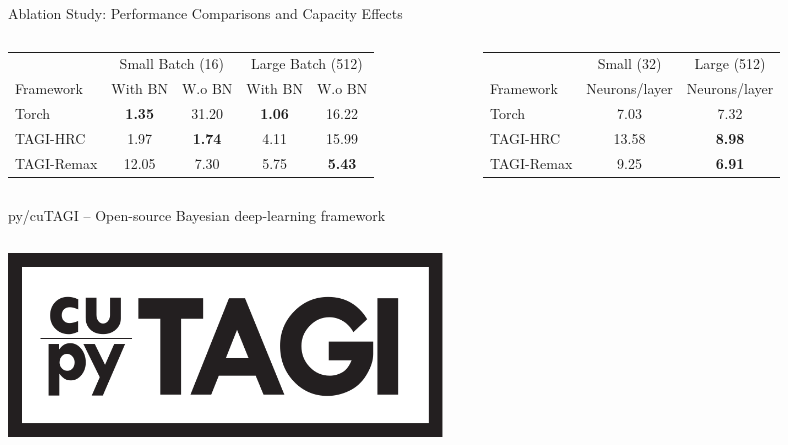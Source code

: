 \documentclass[final]{beamer}
\begin{document}
\begin{frame}[t]
\begin{columns}
\begin{column}[T]{.31\textwidth}
\begin{block}{Ablation Study: Performance Comparisons and Capacity Effects}
\begin{columns}
\begin{column}{0.48\textwidth}
\centering
\begin{tabular}{lcccc}
\toprule
 & \multicolumn{2}{c}{Small Batch (16)} & \multicolumn{2}{c}{Large Batch (512)} \\
Framework & With BN & W.o BN & With BN & W.o BN \\
\midrule
Torch      & \textbf{1.35} & 31.20 & \textbf{1.06} & 16.22 \\
TAGI-HRC       & 1.97         & \textbf{1.74} & 4.11 & 15.99 \\
TAGI-Remax & 12.05         & 7.30         & 5.75 & \textbf{5.43} \\
\bottomrule
\end{tabular}
\end{column}
\begin{column}{0.48\textwidth}
\centering
\begin{tabular}{lcc}
\toprule
 & Small (32) & Large (512) \\
Framework & Neurons/layer & Neurons/layer \\
\midrule
Torch      & 7.03 &  7.32 \\
TAGI-HRC       & 13.58         &  \textbf{8.98} \\
TAGI-Remax &  9.25         &  \textbf{6.91} \\
\bottomrule
\end{tabular}
\end{column}
\end{columns}
\end{block}


\begin{block}{py/cuTAGI -- Open-source Bayesian deep-learning framework}\vspace{0pt}\centering


\begin{columns}
\begin{column}{.35\textwidth}\centering\bigskip


\bigskip


\medskip


\includegraphics[width=115mm]{Figures/cupyTAGI.pdf}\\[20pt]



\end{column}
\end{columns}
\end{block}
\end{column}
\end{columns}
\end{frame}
\end{document}
